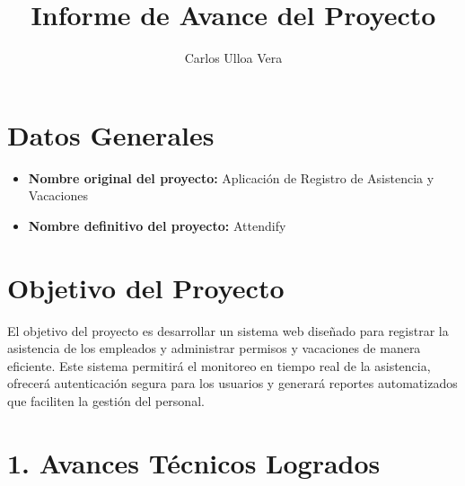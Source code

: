 \documentclass[12pt]{article}
\title{Informe de Avance del Proyecto}
\author{Carlos Ulloa Vera}
\date{}
\begin{document}
\maketitle

\section*{Datos Generales}

\begin{itemize}
  \item \textbf{Nombre original del proyecto:} Aplicación de Registro de Asistencia y Vacaciones
  \item \textbf{Nombre definitivo del proyecto:} Attendify
\end{itemize}

\section*{Objetivo del Proyecto}
\vspace{0.5em}
\noindent
El objetivo del proyecto es desarrollar un sistema web diseñado para registrar la asistencia de los empleados y administrar permisos y vacaciones de manera eficiente. Este sistema permitirá el monitoreo en tiempo real de la asistencia, ofrecerá autenticación segura para los usuarios y generará reportes automatizados que faciliten la gestión del personal.
\vspace{4em}

\section*{1. Avances Técnicos Logrados}
\end{document}
